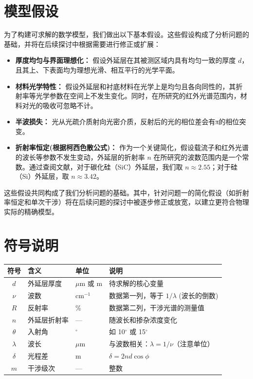 \documentclass[withoutpreface,bwprint]{cumcmthesis} %
\begin{document}
\section{模型假设}

为了构建可求解的数学模型，我们做出以下基本假设。这些假设构成了分析问题的基础，并将在后续探讨中根据需要进行修正或扩展：

\begin{itemize}
    \item \textbf{厚度均匀与界面理想化：} 假设外延层在其被测区域内具有均匀一致的厚度 $d$，且其上、下表面均为理想光滑、相互平行的光学平面。
    \item \textbf{材料光学特性：} 假设外延层和衬底材料在光学上是均匀且各向同性的，其折射率等光学参数在空间上不发生变化。同时，在所研究的红外光谱范围内，材料对光的吸收可忽略不计。
    \item \textbf{半波损失：} 光从光疏介质射向光密介质，反射后的光的相位差会有π的相位突变。
    \item \textbf{折射率恒定(根据柯西色散公式)：} 作为一个关键简化，假设载流子和红外光谱的波长等参数不发生变动，外延层的折射率 $n$ 在所研究的波数范围内是一个常数。通过查阅文献\cite{CAS2024}，对于碳化硅（SiC）外延层，我们取 $n \approx 2.55$；对于硅（Si）外延层，取 $n \approx 3.42$。
    
\end{itemize}
这些假设共同构成了我们分析问题的基础。其中，针对问题一的简化假设（如折射率恒定和单次干涉）将在后续问题的探讨中被逐步修正或放宽，以建立更符合物理实际的精确模型。

\section{符号说明}

\begin{center}
    \begin{tabular}{clll}
        \toprule
        符号        & 含义     & 单位         & 说明                            \\
        \midrule
        $d$       & 外延层厚度  & $\mu$m 或 m & 待求解的核心变量                      \\
        $\nu$     & 波数     & cm$^{-1}$  & 数据第一列，等于 $1/\lambda$ (波长的倒数)  \\
        $R$       & 反射率    & \%         & 数据第二列，干涉光谱的测量值                \\
        $n$       & 外延层折射率 & —          & 随波长和掺杂浓度变化                    \\
        $\theta$  & 入射角    & $^\circ$   & 如 10$^\circ$ 或 15$^\circ$     \\
        $\lambda$ & 波长     & $\mu$m     & 与波数相关：$\lambda = 1/\nu$（注意单位） \\
        $\delta$  & 光程差    & m          & $\delta = 2 n d \cos \phi$    \\
        $m$       & 干涉级次   & —          & 整数                            \\
        \bottomrule
    \end{tabular}
\end{center}
\end{document}
